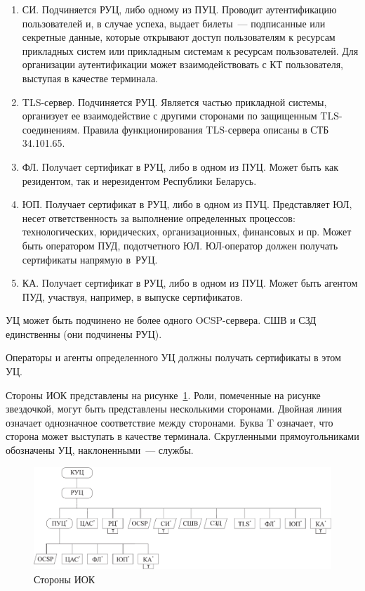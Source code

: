 \begin{enumerate}
\item
СИ. Подчиняется РУЦ, либо одному из ПУЦ.
Проводит аутентификацию пользователей и, в случае успеха, выдает билеты~---
подписанные или секретные данные, которые открывают доступ пользователям к 
ресурсам прикладных систем или прикладным системам к ресурсам пользователей.
Для организации аутентификации может взаимодействовать с КТ пользователя,
выступая в качестве терминала.

\item
TLS-сервер. Подчиняется РУЦ.
Является частью прикладной системы, организует ее взаимодействие 
с другими сторонами по защищенным TLS-соединениям. 
Правила функционирования TLS-сервера описаны в СТБ 34.101.65.

\item
ФЛ. Получает сертификат в РУЦ, либо в одном из ПУЦ.
Может быть как резидентом, так и нерезидентом Республики Беларусь.

\item
ЮП. Получает сертификат в РУЦ, либо в одном из ПУЦ.
%
Представляет ЮЛ, несет ответственность за выполнение определенных 
процессов: технологических, юридических, организационных, финансовых и пр.
%
Может быть оператором ПУД, подотчетного ЮЛ.
ЮЛ-оператор должен получать сертификаты напрямую в~РУЦ.

\item
КА. Получает сертификат в РУЦ, либо в одном из ПУЦ.
%
Может быть агентом ПУД, участвуя, например, в выпуске сертификатов.
\end{enumerate}

УЦ может быть подчинено не более одного OCSP-сервера.
СШВ и СЗД единственны (они подчинены РУЦ). 

Операторы и агенты определенного УЦ должны получать сертификаты в этом УЦ.

Стороны ИОК представлены на рисунке~\ref{Fig.ENTITIES.1}.
Роли, помеченные на рисунке звездочкой, могут быть представлены 
несколькими сторонами. Двойная линия означает однозначное соответствие 
между сторонами. Буква T означает, что сторона может выступать в качестве 
терминала. Скругленными прямоугольниками обозначены УЦ, наклоненными~--- службы.

\begin{figure}[hbt]
\begin{center}
\includegraphics[width=16cm]{../figs/entities}
\end{center}
\caption{Стороны ИОК}
\label{Fig.ENTITIES.1}
\end{figure}

